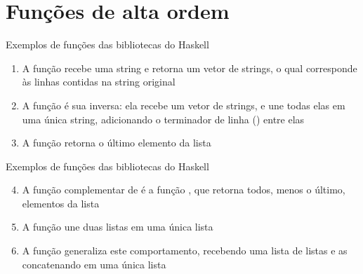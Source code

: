 \section{Funções de alta ordem}

\begin{frame}[fragile]{Exemplos de funções das bibliotecas do Haskell}

    \begin{enumerate}
        \item A função  recebe uma string e retorna um vetor de strings,
            o qual corresponde às linhas contidas na string original

        \item A função  é sua inversa: ela recebe um vetor de strings,
            e une todas elas em uma única string, adicionando o terminador de linha
            () entre elas


        \item A função  retorna o último elemento da lista


    \end{enumerate}

\end{frame}

\begin{frame}[fragile]{Exemplos de funções das bibliotecas do Haskell}

    \begin{enumerate}
        \setcounter{enumi}{3}
        \item A função complementar de  é a função ,
            que retorna todos, menos o último, elementos da lista


        \item A função  une duas listas em uma única lista


        \item A função  generaliza este comportamento, recebendo uma lista
            de listas e as concatenando em uma única lista

    \end{enumerate}

\end{frame}

